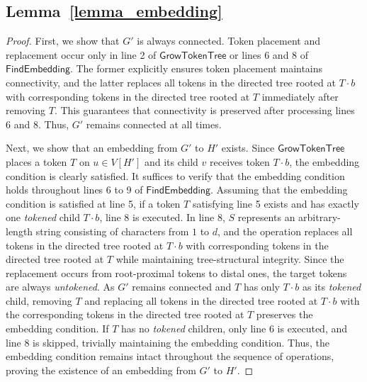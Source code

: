 \documentclass[runningheads]{llncs}
\theoremstyle{plain}
\theoremstyle{definition}
\begin{document}
\subsection{\textbf{Lemma~\ref{lemma_embedding}}}\label{appendix_D3}
\begin{proof}
    First, we show that $G'$ is always connected. Token placement and replacement occur only in line 2 of $\mathsf{GrowTokenTree}$ or lines 6 and 8 of $\mathsf{FindEmbedding}$. The former explicitly ensures token placement maintains connectivity, and the latter replaces all tokens in the directed tree rooted at $T \cdot b$ with corresponding tokens in the directed tree rooted at $T$ immediately after removing $T$. This guarantees that connectivity is preserved after processing lines 6 and 8. Thus, $G'$ remains connected at all times.

    Next, we show that an embedding from $G'$ to $H'$ exists. Since $\mathsf{GrowTokenTree}$ places a token $T$ on $u \in V[H']$ and its child $v$ receives token $T \cdot b$, the embedding condition is clearly satisfied. It suffices to verify that the embedding condition holds throughout lines 6 to 9 of $\mathsf{FindEmbedding}$. Assuming that the embedding condition is satisfied at line 5, if a token $T$ satisfying line 5 exists and has exactly one \textit{tokened} child $T \cdot b$, line 8 is executed. In line 8, $S$ represents an arbitrary-length string consisting of characters from $1$ to $d$, and the operation replaces all tokens in the directed tree rooted at $T \cdot b$ with corresponding tokens in the directed tree rooted at $T$ while maintaining tree-structural integrity. Since the replacement occurs from root-proximal tokens to distal ones, the target tokens are always \textit{untokened}. As $G'$ remains connected and $T$ has only $T \cdot b$ as its \textit{tokened} child, removing $T$ and replacing all tokens in the directed tree rooted at $T \cdot b$ with the corresponding tokens in the directed tree rooted at $T$ preserves the embedding condition. If $T$ has no \textit{tokened} children, only line 6 is executed, and line 8 is skipped, trivially maintaining the embedding condition. Thus, the embedding condition remains intact throughout the sequence of operations, proving the existence of an embedding from $G'$ to $H'$.
\end{proof}
\end{document}

